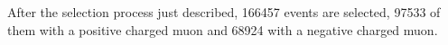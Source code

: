 
After the selection process just described, 166457 events are selected,
97533 of them with a positive charged muon and 68924 with a negative
charged muon.

